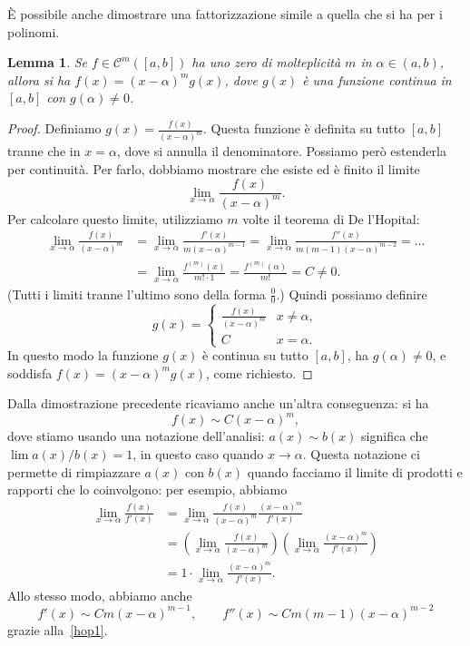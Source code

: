 \documentclass[a4paper]{report}
\newtheorem{lemma}[theorem]{Lemma}
\theoremstyle{definiton}
\theoremstyle{remark}
\begin{document}
È possibile anche dimostrare una fattorizzazione simile a quella che si ha per i polinomi.
\begin{lemma}
Se $f\in\mathcal{C}^m([a,b])$ ha uno zero di molteplicità $m$ in $\alpha \in (a,b)$, allora si ha $f(x) = (x-\alpha)^m g(x)$, dove $g(x)$ è una funzione continua in $[a,b]$ con $g(\alpha) \neq 0$.
\end{lemma}
\begin{proof}
Definiamo $g(x) = \frac{f(x)}{(x-\alpha)^m}$. Questa funzione è definita su tutto $[a,b]$ tranne che in $x=\alpha$, dove si annulla il denominatore. Possiamo però estenderla per continuità. Per farlo, dobbiamo mostrare che esiste ed è finito il limite
\[
\lim_{x\to \alpha} \frac{f(x)}{(x-\alpha)^m}.
\]
Per calcolare questo limite, utilizziamo $m$ volte il teorema di De l'Hopital: 
\begin{align} \label{hop1}
\lim_{x\to \alpha} \frac{f(x)}{(x-\alpha)^m} &= \lim_{x\to \alpha} \frac{f'(x)}{m(x-\alpha)^{m-1}} = \lim_{x\to \alpha} \frac{f''(x)}{m(m-1)(x-\alpha)^{m-2}} = \dots \\
&= \lim_{x\to \alpha} \frac{f^{(m)}(x)}{m!\cdot 1} = \frac{f^{(m)}(\alpha)}{m!} = C\neq 0.
\end{align}
(Tutti i limiti tranne l'ultimo sono della forma $\frac{0}{0}$.)
Quindi possiamo definire
\[
    g(x) = \begin{cases}
        \frac{f(x)}{(x-\alpha)^m} & x\neq \alpha,\\
        C & x=\alpha.
    \end{cases}
\]
In questo modo la funzione $g(x)$ è continua su tutto $[a,b]$, ha $g(\alpha)\neq 0$, e soddisfa $f(x) = (x-\alpha)^m g(x)$, come richiesto.
\end{proof}
Dalla dimostrazione precedente ricaviamo anche un'altra conseguenza: si ha
\begin{equation}
    f(x) \sim C (x-\alpha)^m,
\end{equation}
dove stiamo usando una notazione dell'analisi: $a(x) \sim b(x)$ significa che $\lim a(x) / b(x) = 1$, in questo caso quando $x\to \alpha$. Questa notazione ci permette di rimpiazzare $a(x)$ con $b(x)$ quando facciamo il limite di prodotti e rapporti che lo coinvolgono: per esempio, abbiamo
\begin{align*}
    \lim_{x\to\alpha} \frac{f(x)}{f'(x)} &= \lim_{x\to\alpha} \frac{f(x)}{(x-\alpha)^m} \frac{(x-\alpha)^m}{f'(x)}\\
    & = \left(\lim_{x\to\alpha} \frac{f(x)}{(x-\alpha)^m}\right) \left(\lim_{x\to\alpha} \frac{(x-\alpha)^m}{f'(x)}\right)\\
    & = 1 \cdot \lim_{x\to\alpha} \frac{(x-\alpha)^m}{f'(x)}.
\end{align*}
Allo stesso modo, abbiamo anche
\begin{equation} \label{lhopder}
    f'(x) \sim Cm (x-\alpha)^{m-1}, \quad \quad f''(x) \sim Cm(m-1)(x-\alpha)^{m-2}
\end{equation}
grazie alla~\eqref{hop1}.
\end{document}
